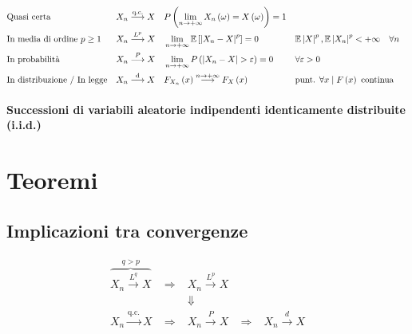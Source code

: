 \documentclass[a4paper,10pt]{article}
\theoremstyle{remark}
\theoremstyle{definition}
\begin{document}
\begin{align*}
 & \text{Quasi certa} &  & X_{n}\overset{\text{q.c.}}{\longrightarrow}X &  & P\left(\lim_{n\rightarrow+\infty}X_{n}\left(\omega\right)=X\left(\omega\right)\right)=1\\
 & \text{In media di ordine \ensuremath{p\geq1}} &  & X_{n}\overset{L^{p}}{\longrightarrow}X &  & \lim_{n\rightarrow+\infty}\mathbb{E}\left[\left|X_{n}-X\right|^{p}\right]=0 &  & \mathbb{E}\left|X\right|^{p},\mathbb{E}\left|X_{n}\right|^{p}<+\infty\quad\forall n\\
 & \text{In probabilità} &  & X_{n}\overset{P}{\longrightarrow}X &  & \lim_{n\rightarrow+\infty}P\left(\left|X_{n}-X\right|>\varepsilon\right)=0 &  & \forall\varepsilon>0\\
 & \text{In distribuzione / In legge} &  & X_{n}\overset{\text{d}}{\longrightarrow}X &  & F_{X_{n}}\left(x\right)\overset{n\rightarrow+\infty}{\longrightarrow}F_{X}\left(x\right) &  & \text{punt. }\forall x\;|\;F\left(x\right)\text{ continua}
\end{align*}


\paragraph*{Successioni di variabili aleatorie indipendenti identicamente distribuite
(i.i.d.)}

\section*{Teoremi}

\subsection*{Implicazioni tra convergenze}

\[
\begin{array}{ccccc}
\overset{q>p}{\overbrace{X_{n}\overset{L^{q}}{\longrightarrow}X}} & \;\Longrightarrow\; & X_{n}\overset{L^{p}}{\longrightarrow}X\\
 &  & \Downarrow\\
X_{n}\overset{\text{q.c.}}{\longrightarrow}X & \;\Longrightarrow\; & X_{n}\overset{P}{\longrightarrow}X & \;\Longrightarrow\; & X_{n}\overset{d}{\longrightarrow}X
\end{array}
\]
\end{document}
